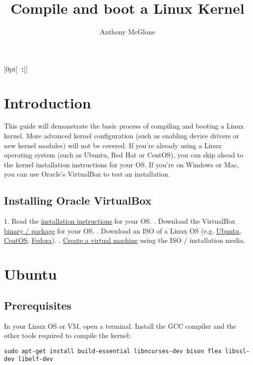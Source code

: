 \documentclass[12pt,a4paper]{report}
\author{Anthony McGlone}\title{Compile and boot a Linux Kernel}
\newcommand{\setupname}[1][\chaptername]{
\titlecontents{chapter}[0pt]{\vspace{1ex}}{\bfseries#1~\thecontentslabel:\quad}{\bfseries}{\bfseries\hfill\contentspage}[]
}
\begin{document}
\maketitle

\tableofcontents

\setupname
\chapter{Introduction}

This guide will demonstrate the basic process of compiling and booting a Linux kernel. More advanced kernel configuration (such as enabling device drivers or new kernel modules) will not be covered. 
\newline
\newline
If you're already using a Linux operating system (such as Ubuntu, Red Hat or CentOS), you can skip ahead to the kernel installation instructions for your OS. 
\newline
\newline
If you're on Windows or Mac, you can use Oracle's VirtualBox to test an installation.

\section{Installing Oracle VirtualBox}

1. Read the \href{https://www.virtualbox.org/manual/ch02.html}{installation instructions} for your OS.
. Download the VirtualBox \href{https://www.virtualbox.org/wiki/Downloads}{binary / package} for your OS.
. Download an ISO of a Linux OS (e.g. \href{https://ubuntu.com/download/desktop}{Ubuntu}, \href{https://www.centos.org/download/}{CentOS}, \href{https://getfedora.org/workstation/download/}{Fedora}).
. \href{https://docs.oracle.com/cd/E26217_01/E26796/html/qs-create-vm.html}{Create a virtual machine} using the ISO / installation media.



\chapter{Ubuntu}

\section{Prerequisites}
In your Linux OS or VM, open a terminal. Install the GCC compiler and the other tools required to compile the kernel:
\newline
\newline
\centerline{\texttt{\scriptsize sudo apt-get install build-essential libncurses-dev bison flex libssl-dev libelf-dev}}
\end{document}
